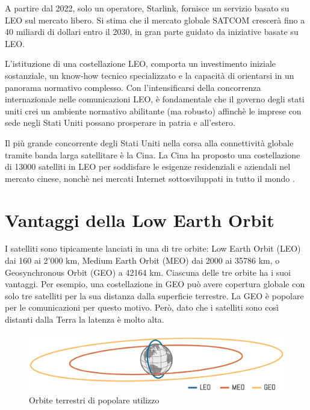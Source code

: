A partire dal 2022, solo un operatore, Starlink, fornisce un servizio basato su \ac{LEO} sul mercato libero.
Si stima che il mercato globale SATCOM crescerà fino a 40 miliardi di dollari entro il 2030, in gran parte guidato da iniziative basate su \ac{LEO}.

L'istituzione di una costellazione \ac{LEO}, comporta un investimento iniziale sostanziale, un know-how tecnico specializzato e la capacità di orientarsi in un panorama normativo complesso.
Con l'intensificarsi della concorrenza internazionale nelle comunicazioni \ac{LEO}, è fondamentale che il governo degli stati uniti crei un ambiente normativo abilitante (ma robusto) affinchè le imprese con sede negli Stati Uniti possano prosperare in patria e all'estero.

Il più grande concorrente degli Stati Uniti nella corsa alla connettività globale tramite banda larga satellitare è la Cina.
La Cina ha proposto una costellazione di 13000 satelliti in \ac{LEO} per soddisfare le esigenze residenziali e aziendali nel mercato cinese, nonchè nei mercati Internet sottosviluppati in tutto il mondo \cite{makena_young_low_2022}.

\section{Vantaggi della Low Earth Orbit}

I satelliti sono tipicamente lanciati in una di tre orbite: Low Earth Orbit (LEO) dai 160 ai 2'000 km, Medium Earth Orbit (MEO) dai 2000 ai 35786 km, o Geosynchronous Orbit (GEO) a 42164 km.
Ciascuna delle tre orbite ha i suoi vantaggi.
Per esempio, una costellazione in GEO può avere copertura globale con solo tre satelliti per la sua distanza dalla superficie terrestre.
La GEO è popolare per le comunicazioni per questo motivo.
Però, dato che i satelliti sono così distanti dalla Terra la latenza è molto alta.

\begin{figure}[htbp]
  \centering
  \includegraphics[width=0.9\linewidth]{./res/img/leo_orbit.png}
  \caption{Orbite terrestri di popolare utilizzo \cite{thomas_g_roberts_popular_2022}}
  \label{fig:leo-orbit}
\end{figure}

